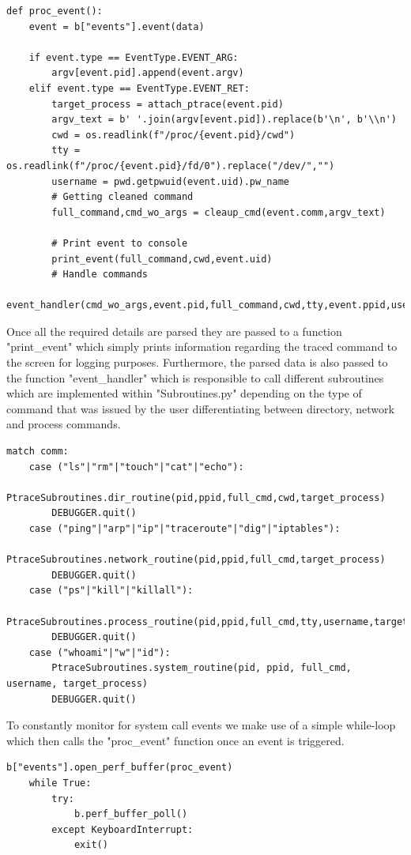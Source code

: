 \begin{lstlisting}
def proc_event():
    event = b["events"].event(data)

    if event.type == EventType.EVENT_ARG:
        argv[event.pid].append(event.argv)
    elif event.type == EventType.EVENT_RET:
        target_process = attach_ptrace(event.pid)
        argv_text = b' '.join(argv[event.pid]).replace(b'\n', b'\\n')
        cwd = os.readlink(f"/proc/{event.pid}/cwd")
        tty = os.readlink(f"/proc/{event.pid}/fd/0").replace("/dev/","")
        username = pwd.getpwuid(event.uid).pw_name
        # Getting cleaned command
        full_command,cmd_wo_args = cleaup_cmd(event.comm,argv_text)

        # Print event to console
        print_event(full_command,cwd,event.uid)
        # Handle commands
        event_handler(cmd_wo_args,event.pid,full_command,cwd,tty,event.ppid,username,target_process)
\end{lstlisting}
Once all the required details are parsed they are passed to a function "print\_event" which simply prints information regarding the traced command to the screen for logging purposes.
Furthermore, the parsed data is also passed to the function "event\_handler" which is responsible to call different subroutines which are implemented within "Subroutines.py" depending on the type of command that was issued by the user differentiating between directory, network and process commands.
\begin{lstlisting}
match comm:
    case ("ls"|"rm"|"touch"|"cat"|"echo"):
        PtraceSubroutines.dir_routine(pid,ppid,full_cmd,cwd,target_process)
        DEBUGGER.quit()
    case ("ping"|"arp"|"ip"|"traceroute"|"dig"|"iptables"):
        PtraceSubroutines.network_routine(pid,ppid,full_cmd,target_process)
        DEBUGGER.quit()
    case ("ps"|"kill"|"killall"):
        PtraceSubroutines.process_routine(pid,ppid,full_cmd,tty,username,target_process)
        DEBUGGER.quit()
    case ("whoami"|"w"|"id"):
        PtraceSubroutines.system_routine(pid, ppid, full_cmd, username, target_process)
        DEBUGGER.quit()
\end{lstlisting}
To constantly monitor for system call events we make use of a simple while-loop which then calls the "proc\_event" function once an event is triggered.
\begin{lstlisting}
b["events"].open_perf_buffer(proc_event)
    while True:
        try:
            b.perf_buffer_poll()
        except KeyboardInterrupt:
            exit()
\end{lstlisting}

